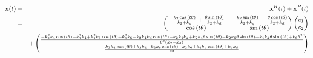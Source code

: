 \documentclass[11pt]{article}
\begin{document}
    \begin{eqnarray}
{\bf x} (t) & = & {\bf x}^H (t) + {\bf x}^P (t) \\
& = & \begin{pmatrix}- \frac{k_{2} \cos{\left(t \theta \right)}}{k_{2} + k_{d}} + \frac{\theta \sin{\left(t \theta \right)}}{k_{2} + k_{d}} & - \frac{k_{2} \sin{\left(t \theta \right)}}{k_{2} + k_{d}} - \frac{\theta \cos{\left(t \theta \right)}}{k_{2} + k_{d}}\\\cos{\left(t \theta \right)} & \sin{\left(t \theta \right)}\end{pmatrix}  \begin{pmatrix} c_1 \\ c_2 \end{pmatrix} \\
&  & + \begin{pmatrix}\frac{- k_{2}^{2} k_{4} \cos{\left(t \theta \right)} - k_{2}^{2} k_{4} + k_{2}^{2} k_{6} \cos{\left(t \theta \right)} + k_{2}^{2} k_{6} - k_{2} k_{4} k_{d} \cos{\left(t \theta \right)} - k_{2} k_{4} k_{d} + k_{2} k_{4} \theta \sin{\left(t \theta \right)} - k_{2} k_{6} \theta \sin{\left(t \theta \right)} + k_{4} k_{d} \theta \sin{\left(t \theta \right)} + k_{6} \theta^{2}}{\theta^{2} \left(k_{2} + k_{d}\right)}\\\frac{k_{2} k_{4} \cos{\left(t \theta \right)} + k_{2} k_{4} - k_{2} k_{6} \cos{\left(t \theta \right)} - k_{2} k_{6} + k_{4} k_{d} \cos{\left(t \theta \right)} + k_{4} k_{d}}{\theta^{2}}\end{pmatrix}
\end{eqnarray}
\end{document}
